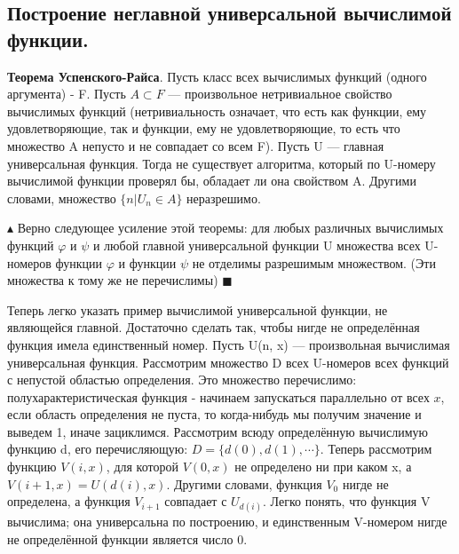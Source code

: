 \subsection{Построение неглавной универсальной вычислимой функции.}

\textbf{Теорема Успенского-Райса}. Пусть класс всех вычислимых функций (одного аргумента) - F. Пусть $A \subset F$ — произвольное нетривиальное свойство вычислимых функций (нетривиальность означает, что есть как функции, ему удовлетворяющие, так и функции, ему не удовлетворяющие, то есть что множество A непусто и не совпадает со всем F).
Пусть U — главная универсальная функция. Тогда не существует алгоритма, который по U-номеру вычислимой функции проверял бы, обладает ли она свойством A. Другими словами, множество $\{n | U_n \in A\}$ неразрешимо.

$\blacktriangle$
Верно следующее усиление этой теоремы: для любых различных вычислимых функций $\varphi$ и $\psi$ и любой главной универсальной функции U множества всех U-номеров функции $\varphi$ и функции $\psi$ не отделимы разрешимым множеством. (Эти множества к тому же не перечислимы)
$\blacksquare$

Теперь легко указать пример вычислимой универсальной функции, не являющейся главной. Достаточно сделать так, чтобы нигде не определённая функция имела единственный номер. Пусть U(n, x) — произвольная вычислимая универсальная функция. Рассмотрим множество D всех U-номеров всех функций с непустой областью определения. Это множество перечислимо: полухарактеристическая функция - начинаем запускаться параллельно от всех $x$, если область определения не пуста, то когда-нибудь мы получим значение и выведем 1, иначе зациклимся. Рассмотрим всюду определённую вычислимую функцию d, его перечисляющую: $D = \{d(0), d(1), \cdots \}$. Теперь рассмотрим функцию $V (i, x)$, для которой $V (0, x)$ не определено ни при каком x, а $V (i+1, x) = U(d(i), x)$. Другими словами, функция $V_0$ нигде не определена, а функция $V_{i+1}$ совпадает с $U_{d(i)}$. Легко понять, что функция V вычислима; она универсальна по построению, и единственным V-номером нигде не определённой функции является число 0.